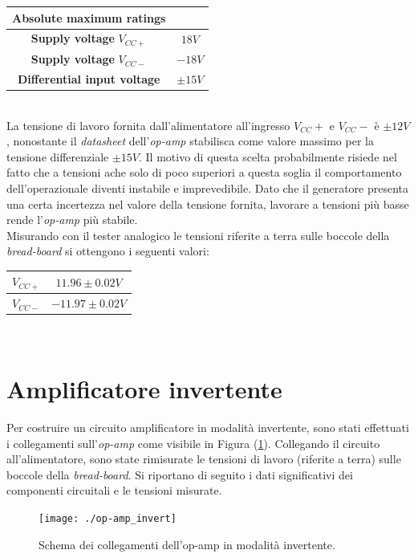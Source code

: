 \documentclass[journal, a4paper]{IEEEtran}
\begin{document}
\begin{tabular}{|c|c|}
\hline \textbf{Absolute maximum ratings} & \\ 
\hline \textbf{Supply voltage} $V_{CC+}$ & $18 \si{V} $ \\ 
\hline \textbf{Supply voltage} $V_{CC-}$  & $-18 \si{V} $ \\ 
\hline \textbf{Differential input voltage} & $\pm 15 \si{V} $  \\ 
\hline 
\end{tabular}\\


La tensione di lavoro fornita dall'alimentatore all'ingresso $V_{CC}+$ e $V_{CC}- $ è $\pm 12 V$, nonostante il \textit{datasheet} dell'\textit{op-amp} stabilisca come valore massimo per la tensione differenziale $\pm 15 \si{V}$. Il motivo di questa scelta probabilmente risiede nel fatto che a tensioni ache solo di poco superiori a questa soglia il comportamento dell'operazionale diventi instabile e imprevedibile. Dato che il generatore presenta una certa incertezza nel valore della tensione fornita, lavorare a tensioni più basse rende l'\textit{op-amp} più stabile.\\

Misurando con il tester analogico le tensioni riferite a terra sulle boccole della \textit{bread-board} si ottengono  i seguenti valori:\\

\begin{tabular}{|c|c|}
\hline $V_{CC+} $ &  $11.96 \pm 0.02 \si{V}$ \\ 
\hline $V_{CC-} $ & $-11.97 \pm 0.02 \si{V}$ \\ 
\hline 
\end{tabular} \\

\section{Amplificatore invertente}
Per costruire un circuito amplificatore in modalità invertente, sono stati effettuati i collegamenti sull'\textit{op-amp} come visibile in Figura (\ref{fig:op-amp_invert}). Collegando il circuito all'alimentatore, sono state rimisurate le tensioni di lavoro (riferite a terra) sulle boccole della \textit{bread-board}. Si riportano di seguito i dati significativi dei componenti circuitali e le tensioni misurate.\\

\begin{figure}
\centering
\texttt{[image: ./op-amp\_invert]}
\caption{Schema dei collegamenti dell'op-amp in modalità invertente.}
\label{fig:op-amp_invert}
\end{figure}
\end{document}
